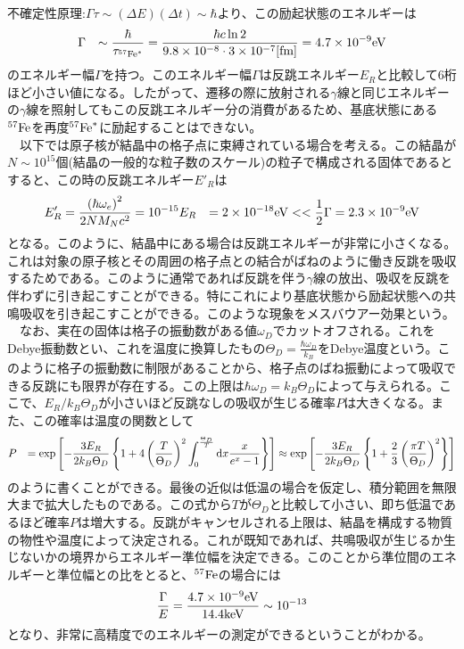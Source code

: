 \documentclass[a4j,fleqn]{jsarticle}
\begin{document}
        不確定性原理:$\Gamma\tau\sim\left(\Delta{E}\right)\left(\Delta{t}\right)\sim\hbar$より、この励起状態のエネルギーは
        \begin{eqnarray}
            \Gamma&&\sim\frac{\hbar}{\tau_{{}^{57}{\rm{Fe}}^{\ast}}}=\frac{\hbar{c}\ln{2}}{9.8\times10^{-8}\cdot3\times10^{-7}{\rm[fm]}}=4.7\times10^{-9}{\rm{eV}}
        \end{eqnarray}
        のエネルギー幅$\Gamma$を持つ。このエネルギー幅$\Gamma$は反跳エネルギー$E_R$と比較して6桁ほど小さい値になる。したがって、遷移の際に放射される$\gamma$線と同じエネルギーの$\gamma$線を照射してもこの反跳エネルギー分の消費があるため、基底状態にある${}^{57}{\rm{Fe}}$を再度${}^{57}{\rm{Fe}}^{\ast}$に励起することはできない。\\
        　以下では原子核が結晶中の格子点に束縛されている場合を考える。この結晶が$N\sim10^{15}$個(結晶の一般的な粒子数のスケール)の粒子で構成される固体であるとすると、この時の反跳エネルギー$E'_R$は
        \begin{eqnarray}
            E'_R=\frac{\left(\hbar\omega_e\right)^2}{2NM_Nc^2}=10^{-15}E_R&&=2\times10^{-18}{\rm{eV}}<<\frac{1}{2}\Gamma=2.3\times10^{-9}{\rm{eV}}
        \end{eqnarray}
        となる。このように、結晶中にある場合は反跳エネルギーが非常に小さくなる。これは対象の原子核とその周囲の格子点との結合がばねのように働き反跳を吸収するためである。このように通常であれば反跳を伴う$\gamma$線の放出、吸収を反跳を伴わずに引き起こすことができる。特にこれにより基底状態から励起状態への共鳴吸収を引き起こすことができる。このような現象をメスバウアー効果という。\\
        　なお、実在の固体は格子の振動数がある値$\omega_D$でカットオフされる。これをDebye振動数とい、これを温度に換算したもの$\Theta_D=\frac{\hbar\omega_D}{k_B}$をDebye温度という。このように格子の振動数に制限があることから、格子点のばね振動によって吸収できる反跳にも限界が存在する。この上限は$\hbar\omega_D=k_B\Theta_D$によって与えられる。ここで、$E_R/k_B\Theta_D$が小さいほど反跳なしの吸収が生じる確率$P$は大きくなる。また、この確率は温度の関数として
        \begin{eqnarray}
            P&&=\exp{\left[-\frac{3E_R}{2k_B\Theta_D}\left\{1+4\left(\frac{T}{\Theta_D}\right)^2\int_{0}^{\frac{\Theta_D}{T}}{{\rm{d}}x\frac{x}{e^x-1}}\right\}\right]}\approx\exp{\left[-\frac{3E_R}{2k_B\Theta_D}\left\{1+\frac{2}{3}\left(\frac{\pi{T}}{\Theta_D}\right)^2\right\}\right]}
        \end{eqnarray}
        のように書くことができる。最後の近似は低温の場合を仮定し、積分範囲を無限大まで拡大したものである。この式から$T$が$\Theta_D$と比較して小さい、即ち低温であるほど確率$P$は増大する。反跳がキャンセルされる上限は、結晶を構成する物質の物性や温度によって決定される。これが既知であれば、共鳴吸収が生じるか生じないかの境界からエネルギー準位幅を決定できる。このことから準位間のエネルギーと準位幅との比をとると、${}^{57}{\rm{Fe}}$の場合には
        \begin{eqnarray}
            \frac{\Gamma}{E}=\frac{4.7\times10^{-9}{\rm{eV}}}{14.4{\rm{keV}}}\sim10^{-13}
        \end{eqnarray}
        となり、非常に高精度でのエネルギーの測定ができるということがわかる。
\end{document}
